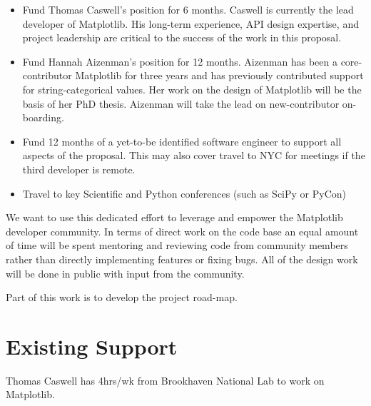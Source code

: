 \documentclass[11pt]{article}  %
\begin{document}
\begin{itemize}

\item Fund Thomas Caswell's position for 6 months.  Caswell is
  currently the lead developer of Matplotlib.  His long-term
  experience, API design expertise, and project leadership are critical
  to the success of the work in this proposal.
\item Fund Hannah Aizenman's position for 12 months.  Aizenman has
  been a core-contributor Matplotlib for three years and has
  previously contributed support for string-categorical values.  Her
  work on the design of Matplotlib will be the basis of her PhD
  thesis.  Aizenman will take the lead on new-contributor on-boarding.
\item Fund 12 months of a yet-to-be identified software engineer to
  support all aspects of the proposal.  This may also cover travel to
  NYC for meetings if the third developer is remote.
\item Travel to key Scientific and Python conferences (such as SciPy
  or PyCon)
\end{itemize}

We want to use this dedicated effort to leverage and empower the
Matplotlib developer community.  In terms of direct work on the code
base an equal amount of time will be spent mentoring and reviewing
code from community members rather than directly implementing features
or fixing bugs.  All of the design work will be done in public with
input from the community.

Part of this work is to develop the project road-map.


\section{Existing Support}

Thomas Caswell has 4hrs/wk from Brookhaven National Lab to work on Matplotlib.


\clearpage

\end{document}
